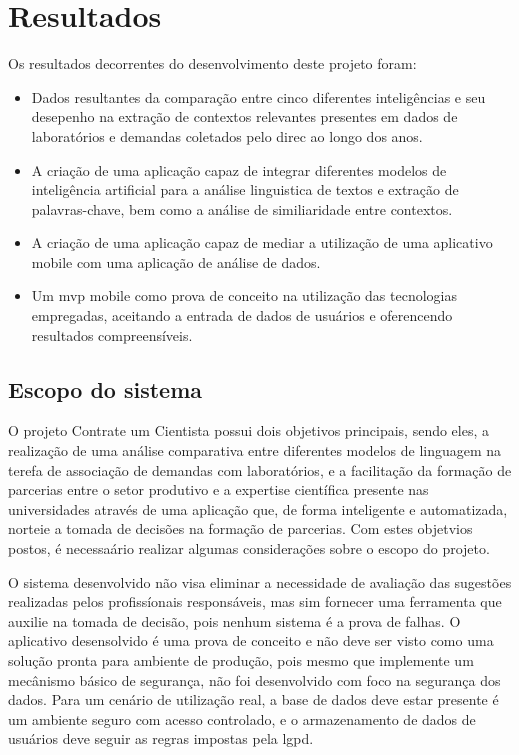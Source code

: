 \chapter{Resultados}\label{cap:resultados}

Os resultados decorrentes do desenvolvimento deste projeto foram:

\begin{itemize}
  \item Dados resultantes da comparação entre cinco diferentes inteligências e seu desepenho na extração de contextos relevantes presentes em dados de laboratórios e demandas coletados pelo \gls{direc} ao longo dos anos.
  \item A criação de uma aplicação capaz de integrar diferentes modelos de inteligência artificial para a análise linguistica de textos e extração de palavras-chave, bem como a análise de similiaridade entre contextos.
  \item A criação de uma aplicação capaz de mediar a utilização de uma aplicativo mobile com uma aplicação de análise de dados.
  \item Um \gls{mvp} mobile como prova de conceito na utilização das tecnologias empregadas, aceitando a entrada de dados de usuários e oferencendo resultados compreensíveis.
\end{itemize}

\section{Escopo do sistema}\label{sec:escopo}

O projeto Contrate um Cientista possui dois objetivos principais, sendo eles, a realização de uma análise comparativa entre diferentes modelos de linguagem na terefa de associação de demandas com laboratórios, e a facilitação da formação de parcerias entre o setor produtivo e a expertise científica presente nas universidades através de uma aplicação que, de forma inteligente e automatizada, norteie a tomada de decisões na formação de parcerias. Com estes objetvios postos, é necessaário realizar algumas considerações sobre o escopo do projeto.

O sistema desenvolvido não visa eliminar a necessidade de avaliação das sugestões realizadas pelos profissíonais responsáveis, mas sim fornecer uma ferramenta que auxilie na tomada de decisão, pois nenhum sistema é a prova de falhas. O aplicativo desensolvido é uma prova de conceito e não deve ser visto como uma solução pronta para ambiente de produção, pois mesmo que implemente um mecânismo básico de segurança, não foi desenvolvido com foco na segurança dos dados. Para um cenário de utilização real, a base de dados deve estar presente é um ambiente seguro com acesso controlado, e o armazenamento de dados de usuários deve seguir as regras impostas pela \gls{lgpd}.

